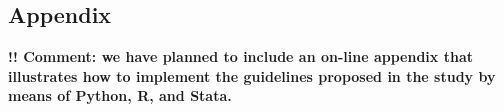 \documentclass[11pt, english]{article}
\begin{document}

\begin{singlespace}
\printbibliography
\end{singlespace}

\clearpage



\begin{appendices}


%


\section*{Appendix}\label{appendix_a}

\noindent \textbf{!! Comment: we have planned to include an on-line appendix
that illustrates how to implement the guidelines proposed in the study by
means of Python, R, and Stata.}


\end{appendices}

\end{document}
